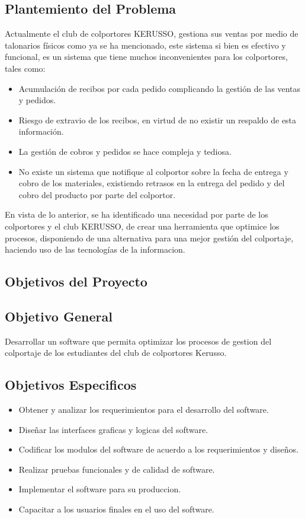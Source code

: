 \documentclass[runningheads]{llncs}
\begin{document}
        \subsection{Plantemiento del Problema}
            Actualmente el club de colportores KERUSSO, gestiona sus ventas por medio de talonarios físicos como ya se ha mencionado, este sistema si bien es efectivo y funcional, es un sistema que tiene muchos inconvenientes para los colportores, tales como:
            \begin{itemize}
                \item Acumulación de recibos por cada pedido complicando la gestión de las ventas y pedidos. 
                \item Riesgo de extravio de los recibos, en virtud de no existir un respaldo de esta información.
                \item La gestión de cobros y pedidos se hace compleja y tediosa.
                \item No existe un sistema que notifique al colportor sobre la fecha de entrega y cobro de los materiales, existiendo retrasos en la entrega del pedido y del cobro del producto por parte del colportor.
            \end{itemize}
            En vista de lo anterior, se ha identificado una necesidad por parte de los colportores y el club KERUSSO, de crear una herramienta que optimice los procesos, disponiendo de una alternativa para una mejor gestión del colportaje, haciendo uso de las tecnologías de la informacion.

        \subsection{Objetivos del Proyecto}
            \subsection*{Objetivo General}
                Desarrollar un software que permita optimizar los procesos de gestion del colportaje de los estudiantes del club de colportores Kerusso.
            \subsection*{Objetivos Especificos}
                \begin{itemize}
                    \item Obtener y analizar los requerimientos para el desarrollo del software.
                    \item Diseñar las interfaces graficas y logicas del software.
                    \item Codificar los modulos del software de acuerdo a los requerimientos y diseños.
                    \item Realizar pruebas funcionales y de calidad de software.
                    \item Implementar el software para su produccion.
                    \item Capacitar a los usuarios finales en el uso del software.
                \end{itemize}
\end{document}
